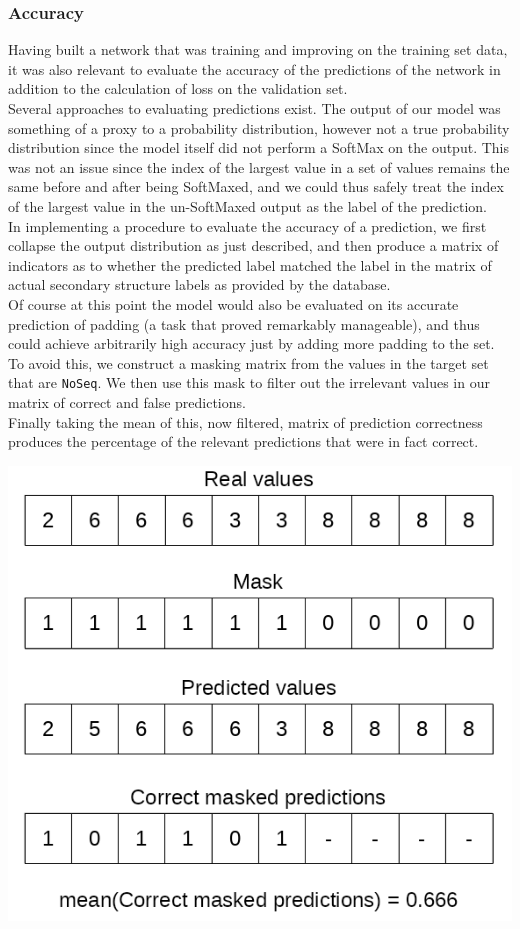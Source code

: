 \begin{multicols}{2}
\subsubsection{Accuracy}
Having built a network that was training and improving on the training set data, it was also relevant to evaluate the accuracy of the predictions of the network in addition to the calculation of loss on the validation set.\\
Several approaches to evaluating predictions exist. The output of our model was something of a proxy to a probability distribution, however not a true probability distribution since the model itself did not perform a SoftMax on the output. This was not an issue since the index of the largest value in a set of values remains the same before and after being SoftMaxed, and we could thus safely treat the index of the largest value in the un-SoftMaxed output as the label of the prediction.\\
In implementing a procedure to evaluate the accuracy of a prediction, we first collapse the output distribution as just described, and then produce a matrix of indicators as to whether the predicted label matched the label in the matrix of actual secondary structure labels as provided by the database.\\
Of course at this point the model would also be evaluated on its accurate prediction of padding (a task that proved remarkably manageable), and thus could achieve arbitrarily high accuracy just by adding more padding to the set. To avoid this, we construct a masking matrix from the values in the target set that are \texttt{NoSeq}. We then use this mask to filter out the irrelevant values in our matrix of correct and false predictions.\\
Finally taking the mean of this, now filtered, matrix of prediction correctness produces the percentage of the relevant predictions that were in fact correct.
\begin{Figure}
 \centering
 \includegraphics[width=0.8\linewidth]{../graphs/accuracy}
 \captionsetup{width=0.8\linewidth, font=small}
\end{Figure}


\end{multicols}
